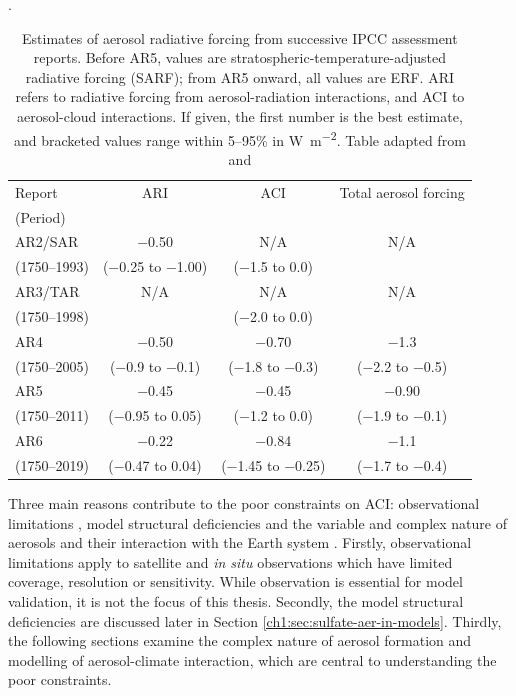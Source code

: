 \begin{table}[H]
\caption[Estimates of aerosol radiative forcing from successive IPCC assessment reports]{Estimates of aerosol radiative forcing from successive IPCC assessment reports. Before AR5, values are stratospheric-temperature-adjusted radiative forcing (SARF); from AR5 onward, all values are ERF. ARI refers to radiative forcing from aerosol-radiation interactions, and ACI to aerosol-cloud interactions. If given, the first number is the best estimate, and bracketed values range within 5--95\% in \unit{\watt\per\metre\squared}. Table adapted from \citet{bellouinAerosolForcingClimate2011} and \citet{forsterEarthEnergyBudget2021}}.
\label{tab:ipcc-rf-summary}
\centering

\begin{tabular}{lccc}
\toprule
Report & ARI & ACI & Total aerosol forcing \\
(Period)\\
\midrule
AR2/SAR & \num{-0.50} & N/A & N/A \\
(1750--1993) & (\num{-0.25} to \num{-1.00}) &  (\num{-1.5} to 0.0)  \\ 
AR3/TAR & N/A & N/A & N/A \\
(1750--1998) & & (\num{-2.0} to 0.0) \\
AR4 & \num{-0.50}  & \num{-0.70}  & \num{-1.3}  \\
(1750--2005) & (\num{-0.9} to \num{-0.1}) & (\num{-1.8} to \num{-0.3}) & (\num{-2.2} to \num{-0.5}) \\
AR5 & \num{-0.45} & \num{-0.45}  & \num{-0.90}  \\
(1750--2011) &  (\num{-0.95} to \num{+0.05}) & (\num{-1.2} to 0.0) & (\num{-1.9} to \num{-0.1})   \\
AR6 & \num{-0.22}  & \num{-0.84}  & \num{-1.1} \\
(1750--2019) & (\num{-0.47} to \num{+0.04}) & (\num{-1.45} to \num{-0.25}) & (\num{-1.7} to \num{-0.4})  \\
\bottomrule
\end{tabular}
\end{table}

Three main reasons contribute to the poor constraints on ACI: observational limitations \citep{raschObservationalConstraintCloud2018, johnsonRobustObservationalConstraint2020}, model structural deficiencies \citep{woodImprovingOurFundamental2016, regayreIdentifyingClimateModel2023,rostronRobustObservationalConstraint2019} and the variable and complex nature of aerosols and their interaction with the Earth system \citep{liScatteringAbsorbingAerosols2022, donnerClimateEffectsAerosolCloud2014, malavelleStrongConstraintsAerosol2017}. Firstly, observational limitations apply to satellite and \textit{in situ} observations which have limited coverage, resolution or sensitivity. While observation is essential for model validation, it is not the focus of this thesis. Secondly, the model structural deficiencies are discussed later in Section \ref{ch1:sec:sulfate-aer-in-models}. Thirdly, the following sections examine the complex nature of aerosol formation and modelling of aerosol-climate interaction, which are central to understanding the poor constraints.


